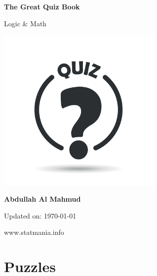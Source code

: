 \documentclass[14pt]{article}
\begin{document}
\begin{titlepage}
    \begin{center}
        \vspace*{1cm}
            
        \Huge
        \textbf{The Great Quiz Book}
            
        \vspace{0.5cm}
        \huge
        Logic \& Math
        
        \includegraphics[width=8cm]{img/quiz.jpg}
            
        \vspace{1.5cm}
            
        \textbf{Abdullah Al Mahmud}

     \vspace{1.5cm}

	\Large 
	Updated on: \today
	
	
            
        \vfill
            

            
        \vspace{0.8cm}
            

            
        \Large
        www.statmania.info\\
            
    \end{center}
\end{titlepage}

\section{Puzzles}
\end{document}
